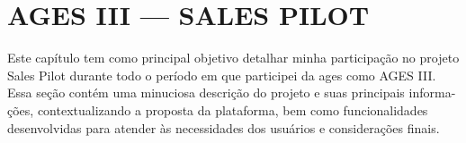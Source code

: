 \chapter[AGES III --- SALES PILOT]{AGES III --- SALES PILOT}

Este capítulo tem como principal objetivo detalhar minha participação no projeto Sales Pilot durante todo o período em que participei da \ac{ages} como AGES III.
Essa seção contém uma minuciosa descrição do projeto e suas principais informa-
ções, contextualizando a proposta da plataforma, bem como funcionalidades desenvolvidas para atender às necessidades dos usuários e considerações finais.





